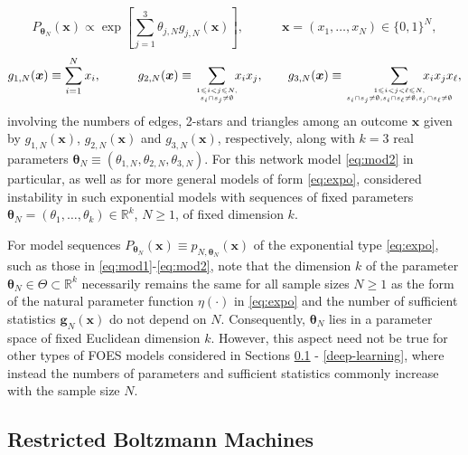 \documentclass[numbib]{imamat}
\theoremstyle{theorem}
\theoremstyle{lemma}
\theoremstyle{example}
\theoremstyle{corollary}
\theoremstyle{definition}
\theoremstyle{remark}
\theoremstyle{approximation}
\theoremstyle{scheme}
\begin{document}
\begin{equation}
\label{eq:mod2}
P_{\boldsymbol \theta_N}(\boldsymbol x) \propto
 \exp\left[\sum_{j=1}^3 \theta_{j,N} g_{j,N}(\boldsymbol x)\right], \quad\qquad \boldsymbol x=(x_1,\ldots,x_N)  \in\{0,1\}^N,
\end{equation}
\[
  g_{1,N}(\boldsymbol x) \equiv \sum_{i=1}^N  x_i, \qquad\quad g_{2,N}(\boldsymbol x) \equiv \sum_{1 \leq i<j \leq N,\atop s_i \cap s_j \neq \emptyset}\!\!\!   x_i x_j, \qquad
  g_{3,N}(\boldsymbol x) \equiv \sum_{1 \leq i<j<\ell \leq N, \atop s_i \cap s_j \neq \emptyset,s_i \cap s_\ell \neq \emptyset, \\ s_j \cap s_\ell \neq \emptyset } \!\!\!\!\!\!\!\!  \!\!\!\!\!\!\!\!   x_i x_j x_\ell,
\]
involving the numbers of edges, 2-stars and triangles among an outcome \(\boldsymbol x\) given by \(g_{1,N}(\boldsymbol x)\), \(g_{2,N}(\boldsymbol x)\) and \(g_{3,N}(\boldsymbol x)\), respectively, along with \(k=3\) real parameters \(\boldsymbol \theta_N \equiv (\theta_{1,N},\theta_{2,N},\theta_{3,N})\). For this network model \eqref{eq:mod2} in particular, as well as for more general models of form \eqref{eq:expo}, \citet{schweinberger2011instability} considered instability in such exponential models with sequences of fixed parameters \(\boldsymbol \theta_N = (\theta_1,\ldots,\theta_k)\in\mathbb{R}^k\), \(N \geq 1\), of fixed dimension \(k\).

For model sequences \(P_{\boldsymbol \theta_N}(\boldsymbol x)\equiv p_{N,\boldsymbol \theta_N}(\boldsymbol x)\) of the exponential type \eqref{eq:expo}, such as those in \eqref{eq:mod1}-\eqref{eq:mod2}, note that the dimension \(k\) of the parameter \(\boldsymbol \theta_N\in\Theta \subset \mathbb{R}^k\) necessarily remains the same for all sample sizes \(N \geq 1\) as the form of the natural parameter function \(\eta(\cdot)\) in \eqref{eq:expo} and the number of sufficient statistics \(\boldsymbol g_{N}(\boldsymbol x)\) do not depend on \(N\). Consequently, \(\boldsymbol \theta_N\) lies in a parameter space of fixed Euclidean dimension \(k\). However, this aspect need not be true for other types of FOES models considered in Sections \ref{rbm} - \ref{deep-learning}, where instead the numbers of parameters and sufficient statistics commonly increase with the sample size \(N\).

\hypertarget{rbm}{%
\subsection{Restricted Boltzmann Machines}\label{rbm}}
\end{document}
